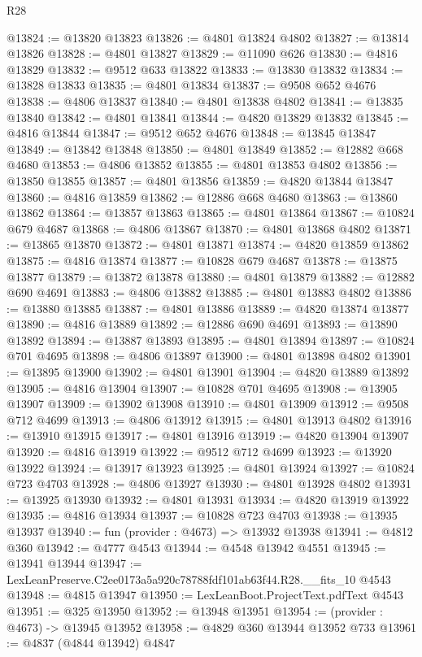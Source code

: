 \begin{lexlean}{R28}
\begin{coremodule}
@13824 := @13820 @13823
@13826 := @4801 @13824 @4802
@13827 := @13814 @13826
@13828 := @4801 @13827
@13829 := @11090 @626
@13830 := @4816 @13829
@13832 := @9512 @633 @13822
@13833 := @13830 @13832
@13834 := @13828 @13833
@13835 := @4801 @13834
@13837 := @9508 @652 @4676
@13838 := @4806 @13837
@13840 := @4801 @13838 @4802
@13841 := @13835 @13840
@13842 := @4801 @13841
@13844 := @4820 @13829 @13832
@13845 := @4816 @13844
@13847 := @9512 @652 @4676
@13848 := @13845 @13847
@13849 := @13842 @13848
@13850 := @4801 @13849
@13852 := @12882 @668 @4680
@13853 := @4806 @13852
@13855 := @4801 @13853 @4802
@13856 := @13850 @13855
@13857 := @4801 @13856
@13859 := @4820 @13844 @13847
@13860 := @4816 @13859
@13862 := @12886 @668 @4680
@13863 := @13860 @13862
@13864 := @13857 @13863
@13865 := @4801 @13864
@13867 := @10824 @679 @4687
@13868 := @4806 @13867
@13870 := @4801 @13868 @4802
@13871 := @13865 @13870
@13872 := @4801 @13871
@13874 := @4820 @13859 @13862
@13875 := @4816 @13874
@13877 := @10828 @679 @4687
@13878 := @13875 @13877
@13879 := @13872 @13878
@13880 := @4801 @13879
@13882 := @12882 @690 @4691
@13883 := @4806 @13882
@13885 := @4801 @13883 @4802
@13886 := @13880 @13885
@13887 := @4801 @13886
@13889 := @4820 @13874 @13877
@13890 := @4816 @13889
@13892 := @12886 @690 @4691
@13893 := @13890 @13892
@13894 := @13887 @13893
@13895 := @4801 @13894
@13897 := @10824 @701 @4695
@13898 := @4806 @13897
@13900 := @4801 @13898 @4802
@13901 := @13895 @13900
@13902 := @4801 @13901
@13904 := @4820 @13889 @13892
@13905 := @4816 @13904
@13907 := @10828 @701 @4695
@13908 := @13905 @13907
@13909 := @13902 @13908
@13910 := @4801 @13909
@13912 := @9508 @712 @4699
@13913 := @4806 @13912
@13915 := @4801 @13913 @4802
@13916 := @13910 @13915
@13917 := @4801 @13916
@13919 := @4820 @13904 @13907
@13920 := @4816 @13919
@13922 := @9512 @712 @4699
@13923 := @13920 @13922
@13924 := @13917 @13923
@13925 := @4801 @13924
@13927 := @10824 @723 @4703
@13928 := @4806 @13927
@13930 := @4801 @13928 @4802
@13931 := @13925 @13930
@13932 := @4801 @13931
@13934 := @4820 @13919 @13922
@13935 := @4816 @13934
@13937 := @10828 @723 @4703
@13938 := @13935 @13937
@13940 := fun (provider : @4673) => @13932 @13938
@13941 := @4812 @360
@13942 := @4777 @4543
@13944 := @4548 @13942 @4551
@13945 := @13941 @13944
@13947 := LexLeanPreserve.C2ee0173a5a920c78788fdf101ab63f44.R28.__fits_10 @4543
@13948 := @4815 @13947
@13950 := LexLeanBoot.ProjectText.pdfText @4543
@13951 := @325 @13950
@13952 := @13948 @13951
@13954 := (provider : @4673) -> @13945 @13952
@13958 := @4829 @360 @13944 @13952 @733
@13961 := @4837 (@4844 @13942) @4847

\end{coremodule}
\end{lexlean}
